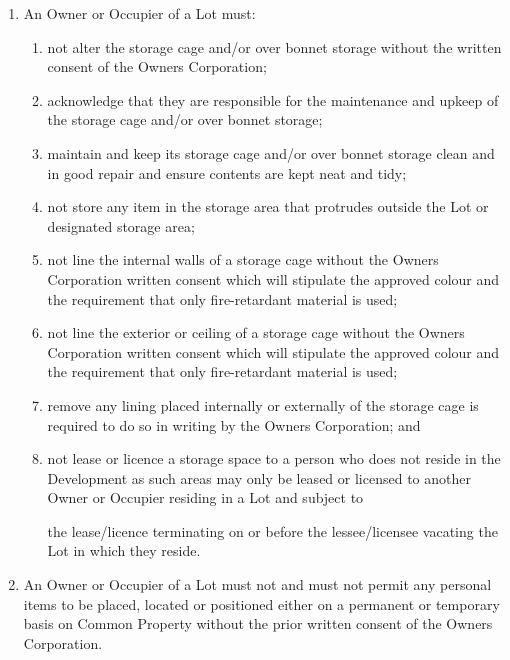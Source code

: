 \documentclass{article}
\begin{document}
\begin{enumerate}[label=\arabic*.]
\begin{enumerate}[label=\arabic{enumi}.\arabic*.]
\begin{enumerate}[label=\arabic{enumi}.\arabic*.]
\begin{enumerate}[label=(\arabic*)]
\begin{enumerate}[label=(\alph*)]
\end{enumerate}

\item  An Owner or Occupier of a Lot must:

\begin{enumerate}[label=(\alph*)]

\item  not alter the storage cage and/or over bonnet storage without the written consent of the Owners Corporation;

\item  acknowledge that they are responsible for the maintenance and upkeep of the storage cage and/or over bonnet storage;

\item  maintain and keep its storage cage and/or over bonnet storage clean and in good repair and ensure contents are kept neat and tidy;

\item  not store any item in the storage area that protrudes outside the Lot or designated storage area;

\item  not line the internal walls of a storage cage without the Owners Corporation written consent which will stipulate the approved colour and the requirement that only fire-retardant material is used;

\item  not line the exterior or ceiling of a storage cage without the Owners Corporation written consent which will stipulate the approved colour and the requirement that only fire-retardant material is used;

\item  remove any lining placed internally or externally of the storage cage is required to do so in writing by the Owners Corporation; and

\item  not lease or licence a storage space to a person who does not reside in the Development as such areas may only be leased or licensed to another Owner or Occupier residing in a Lot and subject to
\newpage

the lease/licence terminating on or before the lessee/licensee vacating the Lot in which they reside.

\end{enumerate}

\item  An Owner or Occupier of a Lot must not and must not permit any personal items to be placed, located or positioned either on a permanent or temporary basis on Common Property without the prior written consent of the Owners Corporation.


\end{enumerate}
\end{enumerate}
\end{enumerate}
\end{enumerate}
\end{document}
